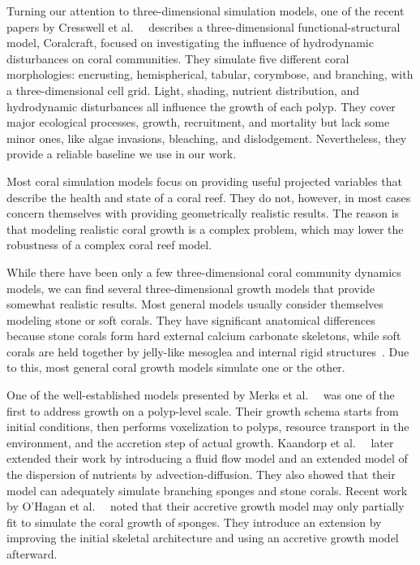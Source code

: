 \documentclass[9pt]{pnas-new}
\renewcommand{\etal}{et al.\ }
\begin{document}
Turning our attention to three-dimensional simulation models, one of the recent papers by Cresswell \etal~\cite{coral_community_3D} describes a three-dimensional functional-structural model, Coralcraft, focused on investigating the influence of hydrodynamic disturbances on coral communities. They simulate five different coral morphologies: encrusting, hemispherical, tabular, corymbose, and branching, with a three-dimensional cell grid. Light, shading, nutrient distribution, and hydrodynamic disturbances all influence the growth of each polyp. They cover major ecological processes, growth, recruitment, and mortality but lack some minor ones, like algae invasions, bleaching, and dislodgement. Nevertheless, they provide a reliable baseline we use in our work.

Most coral simulation models focus on providing useful projected variables that describe the health and state of a coral reef. They do not, however, in most cases concern themselves with providing geometrically realistic results. The reason is that modeling realistic coral growth is a complex problem, which may lower the robustness of a complex coral reef model.

While there have been only a few three-dimensional coral community dynamics models, we can find several three-dimensional growth models that provide somewhat realistic results. Most general models usually consider themselves modeling stone or soft corals. They have significant anatomical differences because stone corals form hard external calcium carbonate skeletons, while soft corals are held together by jelly-like mesoglea and internal rigid structures~\cite{corals_book_1983}. Due to this, most general coral growth models simulate one or the other. 

One of the well-established models presented by Merks \etal~\cite{polyp_growth} was one of the first to address growth on a polyp-level scale. Their growth schema starts from initial conditions, then performs voxelization to polyps, resource transport in the environment, and the accretion step of actual growth. Kaandorp \etal~\cite{Kaandorp_2013} later extended their work by introducing a fluid flow model and an extended model of the dispersion of nutrients by advection-diffusion. They also showed that their model can adequately simulate branching sponges and stone corals. Recent work by O'Hagan \etal~\cite{sponge_growth} noted that their accretive growth model may only partially fit to simulate the coral growth of sponges. They introduce an extension by improving the initial skeletal architecture and using an accretive growth model afterward.
\end{document}
